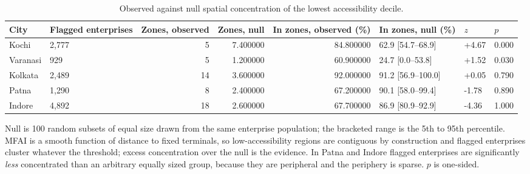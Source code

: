 \begin{table}[htbp]
\centering
\small
\caption{Observed against null spatial concentration of the lowest accessibility decile.}
\label{tab:t15_null}
\begin{tabular}{llrrrlll}
\toprule
City & Flagged enterprises & Zones, observed & Zones, null & In zones, observed (\%) & In zones, null (\%) & $z$ & $p$ \\
\midrule
Kochi & 2,777 & 5 & 7.400000 & 84.800000 & 62.9 [54.7–68.9] & +4.67 & 0.000 \\
Varanasi & 929 & 5 & 1.200000 & 60.900000 & 24.7 [0.0–53.8] & +1.52 & 0.030 \\
Kolkata & 2,489 & 14 & 3.600000 & 92.000000 & 91.2 [56.9–100.0] & +0.05 & 0.790 \\
Patna & 1,290 & 8 & 2.400000 & 67.200000 & 90.1 [58.0–99.4] & -1.78 & 0.890 \\
Indore & 4,892 & 18 & 2.600000 & 67.700000 & 86.9 [80.9–92.9] & -4.36 & 1.000 \\
\bottomrule
\end{tabular}
\begin{tablenotes}\footnotesize
\item Null is 100 random subsets of equal size drawn from the same enterprise population; the bracketed range is the 5th to 95th percentile. MFAI is a smooth function of distance to fixed terminals, so low-accessibility regions are contiguous by construction and flagged enterprises cluster whatever the threshold; excess concentration over the null is the evidence. In Patna and Indore flagged enterprises are significantly \emph{less} concentrated than an arbitrary equally sized group, because they are peripheral and the periphery is sparse. $p$ is one-sided.
\end{tablenotes}
\end{table}
